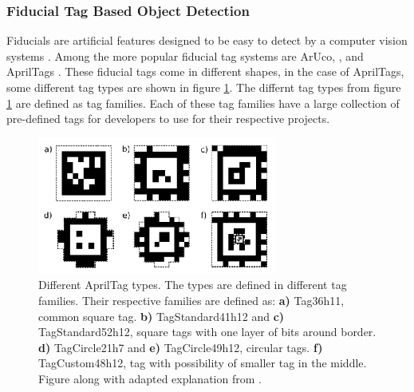 \subsubsection{Fiducial Tag Based Object Detection }\label{sec:T:OD:TagBasedObjectDetection}
Fiducials are artificial features designed to be easy to detect by a computer vision systems \cite{krogius2019iros}. Among the more popular fiducial tag systems are ArUco, \cite{JuardoSalinas2016} \cite{RamirezSalinas2018},  and AprilTags \cite{olson2011tags} \cite{wang2016iros} \cite{krogius2019iros}. These fiducial tags come in different shapes, in the case of AprilTags, some different tag types are shown in figure \ref{fig:T:PAP:MV:AprilTag}. The differnt tag types from figure \ref{fig:T:PAP:MV:AprilTag} are defined as tag families. Each of these tag families have a large collection of pre-defined tags for developers to use for their respective projects.

\begin{figure}[htp]
  \centering
  \includegraphics[width = 0.7\textwidth]{Figures/figAprilTag.pdf}
  \caption{Different AprilTag types. The types are defined in different tag families. Their respective families are defined as: \textbf{a)} Tag36h11, common square tag. \textbf{b)} TagStandard41h12 and \textbf{c)} TagStandard52h12, square tags with one layer of bits around border. \textbf{d)} TagCircle21h7 and \textbf{e)} TagCircle49h12, circular tags. \textbf{f)} TagCustom48h12, tag with possibility of smaller tag in the middle. Figure along with adapted explanation from \cite{krogius2019iros}.}
  \label{fig:T:PAP:MV:AprilTag}
\end{figure}



